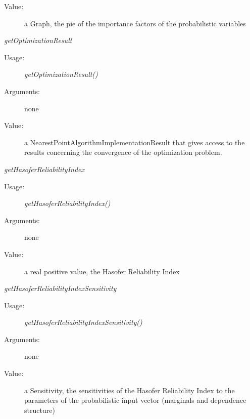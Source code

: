 \begin{description}
\begin{description}
\begin{description}
\item[Value:]  a Graph, the pie of the importance factors of the probabilistic variables
\end{description}
\bigskip
\bigskip

\item \textit{getOptimizationResult}
\begin{description}
\item[Usage:] \textit{getOptimizationResult()}
\item[Arguments:] none
\item[Value:]  a NearestPointAlgorithmImplementationResult that
gives access to the results concerning the convergence of the
optimization problem.


\end{description}
\bigskip

\item \textit{getHasoferReliabilityIndex}
\begin{description}
\item[Usage:] \textit{getHasoferReliabilityIndex()}
\item[Arguments:] none
\item[Value:]  a real positive value, the Hasofer Reliability Index
\end{description}
\bigskip

\item \textit{getHasoferReliabilityIndexSensitivity}
\begin{description}
\item[Usage:] \textit{getHasoferReliabilityIndexSensitivity()}
\item[Arguments:] none
\item[Value:]  a Sensitivity, the sensitivities of the Hasofer Reliability Index to the parameters of the probabilistic input vector (marginals and dependence structure)
\end{description}
\bigskip


\end{description}
\end{description}

